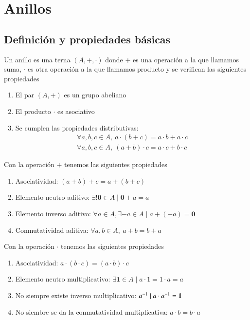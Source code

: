 
\chapter{Anillos}

\newcommand{\0}{\mathbf{0}}
\newcommand{\1}{\mathbf{1}}

\section{Definición y propiedades básicas}

\begin{dfn}[Anillo]
	Un anillo es una terna $(A, +, \cdot)$ donde $+$ es una operación a la que llamamos suma, $\cdot$ es otra operación a la que llamamos producto y se verifican las siguientes propiedades
	\begin{enumerate}
		\item El par $(A, +)$ es un grupo abeliano
		\item El producto $\cdot$ es asociativo
		\item Se cumplen las propiedades distributivas:
		\begin{align}
			\forall a, b , c \in A,\ a\cdot (b + c) = a\cdot b + a \cdot c \\
			\forall a, b , c \in A,\ (a + b) \cdot c = a\cdot c + b \cdot c
		\end{align}
	\end{enumerate}
\end{dfn}

Con la operación $+$ tenemos las siguientes propiedades
\begin{enumerate}
	\item Asociatividad: $(a+b)+c = a+(b+c)$
	\item Elemento neutro aditivo: $\exists! \0 \in A \mid \0+a = a$
	\item Elemento inverso aditivo: $\forall a \in A, \exists -a \in A \mid a + (-a) = \0$
	\item Conmutatividad aditiva: $\forall a, b \in A,\ a+b = b+a$
\end{enumerate}

Con la operación $\cdot$ tenemos las siguientes propiedades
\begin{enumerate}
	\item Asociatividad: $a\cdot (b \cdot c) = (a \cdot b) \cdot c$
	\item Elemento neutro multiplicativo: $\exists \1 \in A \mid a\cdot 1 = 1 \cdot a = a$
	\item No siempre existe inverso multiplicativo: $\inv{a} \mid a\cdot \inv{a} = \1$
	\item No siembre se da la conmutatividad multiplicativa: $a \cdot b = b\cdot a$
\end{enumerate}

